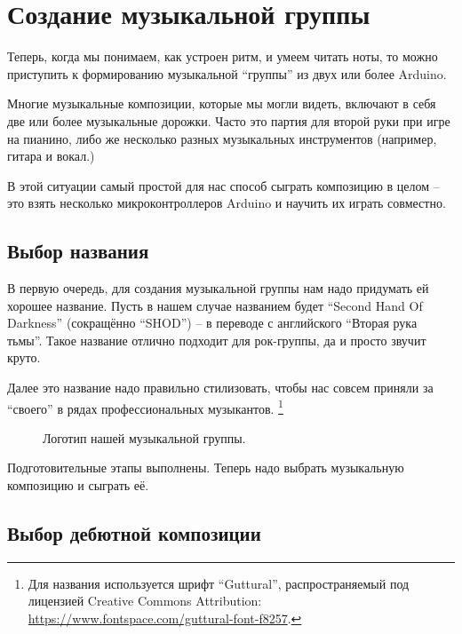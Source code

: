 \documentclass[../sparc.tex]{subfiles}
\begin{document}
\newpage
\section{Создание музыкальной группы}

Теперь, когда мы понимаем, как устроен ритм, и умеем читать ноты, то можно
приступить к формированию музыкальной ``группы'' из двух или более Arduino.

Многие музыкальные композиции, которые мы могли видеть, включают в себя две или
более музыкальные дорожки.  Часто это партия для второй руки при игре на
пианино, либо же несколько разных музыкальных инструментов (например, гитара и
вокал.)

В этой ситуации самый простой для нас способ сыграть композицию в целом -- это
взять несколько микроконтроллеров Arduino и научить их играть совместно.

\subsection{Выбор названия}

В первую очередь, для создания музыкальной группы нам надо придумать ей хорошее
название.  Пусть в нашем случае названием будет ``Second Hand Of Darkness''
(сокращённо ``SHOD'') -- в переводе с английского ``Вторая рука тьмы''.  Такое
название отлично подходит для рок-группы, да и просто звучит круто.

Далее это название надо правильно стилизовать, чтобы нас совсем приняли за
``своего'' в рядах профессиональных музыкантов. \footnote{Для названия
используется шрифт ``Guttural'', распространяемый под лицензией Creative Commons
Attribution: \url{https://www.fontspace.com/guttural-font-f8257}.}

\begin{figure}[ht]
\centering

\caption{Логотип нашей музыкальной группы.}
\label{fig:shod-band-logo}
\end{figure}

Подготовительные этапы выполнены. Теперь надо выбрать музыкальную композицию и
сыграть её.

\subsection{Выбор дебютной композиции}
\end{document}
